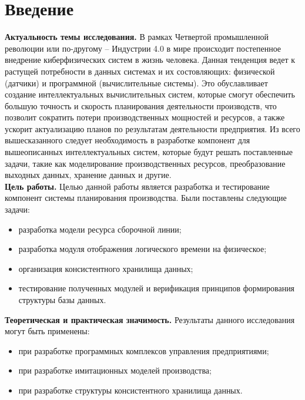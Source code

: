 \section*{Введение}
\indent \textbf{Актуальность темы исследования.}
В рамках Четвертой промышленной революции или по-другому -- Индустрии 4.0 в мире происходит постепенное внедрение киберфизических систем в жизнь человека.
Данная тенденция ведет к растущей потребности в данных системах и их состовляющих: физической (датчики) и программной (вычислительные системы).
Это обуславливает создание интеллектуальных вычислительных систем, которые смогут обеспечить большую точность и скорость планирования деятельности производств, что позволит сократить потери производственных мощностей и ресурсов, а также ускорит актуализацию планов по результатам деятельности предприятия.
Из всего вышесказанного следует необходимость в разработке компонент для вышеописанных интеллектуальных систем, которые будут решать поставленные задачи, такие как моделирование производственных ресурсов, преобразование выходных данных, хранение данных и другие.\\
\indent \textbf{Цель работы.}
Целью данной работы является разработка и тестирование компонент системы планирования производства.
Были поставлены следующие задачи:
\begin{itemize}
	\item разработка модели ресурса сборочной линии;
	\item разработка модуля отображения логического времени на физическое;
	\item организация консистентного хранилища данных;
	\item тестирование полученных модулей и верификация принципов формирования структуры базы данных.
\end{itemize}

\indent \textbf{Теоретическая и практическая значимость.}
Результаты данного исследования могут быть применены:
\begin{itemize}
	\item при разработке программных комплексов управления предприятиями;
	\item при разработке имитационных моделей производства;
	\item при разработке структуры консистентного хранилища данных.
\end{itemize}


